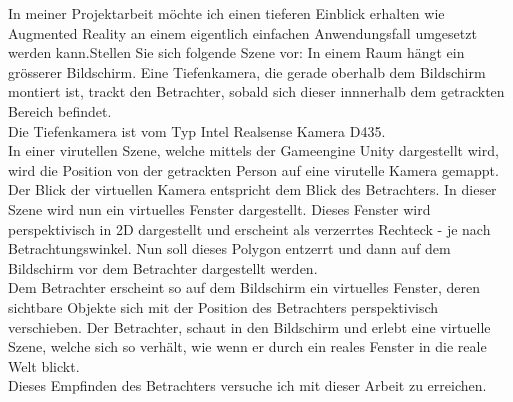 
In meiner Projektarbeit möchte ich einen tieferen Einblick erhalten wie Augmented Reality an einem eigentlich einfachen Anwendungsfall umgesetzt werden kann.Stellen Sie sich folgende Szene vor: In einem Raum hängt ein grösserer Bildschirm. Eine Tiefenkamera, die gerade oberhalb dem Bildschirm montiert ist, trackt den Betrachter, sobald sich dieser innnerhalb dem getrackten Bereich befindet. \\ Die Tiefenkamera ist vom Typ Intel Realsense Kamera D435. \\ In einer virutellen Szene, welche mittels der Gameengine Unity dargestellt wird, wird die Position von der getrackten Person auf eine virutelle Kamera gemappt. Der Blick der virtuellen Kamera entspricht dem Blick des Betrachters. In dieser Szene wird nun ein virtuelles Fenster dargestellt. Dieses Fenster wird perspektivisch in 2D dargestellt und erscheint als verzerrtes Rechteck - je nach Betrachtungswinkel. Nun soll dieses Polygon entzerrt und dann auf dem Bildschirm vor dem Betrachter dargestellt werden. \\ Dem Betrachter erscheint so auf dem Bildschirm ein virtuelles Fenster, deren sichtbare Objekte sich mit der Position des Betrachters perspektivisch verschieben. Der Betrachter, schaut in den Bildschirm und erlebt eine virtuelle Szene, welche sich so verhält, wie wenn er durch ein reales Fenster in die reale Welt blickt. \\ Dieses Empfinden des Betrachters versuche ich mit dieser Arbeit zu erreichen.

